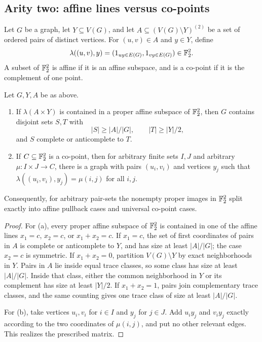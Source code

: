 \subsection{Arity two: affine lines versus co-points}

Let $G$ be a graph, let $Y\subseteq V(G)$, and let $A\subseteq (V(G)\setminus Y)^{(2)}$ be a set of ordered pairs of distinct vertices. For $(u,v)\in A$ and $y\in Y$, define
\[
  \lambda((u,v),y)=(1_{uy\in E(G)},1_{vy\in E(G)})\in \mathbb F_2^2.
\]
A subset of $\mathbb F_2^2$ is affine if it is an affine subspace, and is a co-point if it is the complement of one point.

\begin{proposition}\label{prop:arity-two}
Let $G,Y,A$ be as above.
\begin{enumerate}[label=(\alph*)]
\item If $\lambda(A\times Y)$ is contained in a proper affine subspace of $\mathbb F_2^2$, then $G$ contains disjoint sets $S,T$ with
\[
  |S|\ge |A|/|G|, \qquad |T|\ge |Y|/2,
\]
and $S$ complete or anticomplete to $T$.
\item If $C\subseteq \mathbb F_2^2$ is a co-point, then for arbitrary finite sets $I,J$ and arbitrary $\mu:I\times J\to C$, there is a graph with pairs $(u_i,v_i)$ and vertices $y_j$ such that $\lambda((u_i,v_i),y_j)=\mu(i,j)$ for all $i,j$.
\end{enumerate}
Consequently, for arbitrary pair-sets the nonempty proper images in $\mathbb F_2^2$ split exactly into affine pullback cases and universal co-point cases.
\end{proposition}

\begin{proof}
For (a), every proper affine subspace of $\mathbb F_2^2$ is contained in one of the affine lines $x_1=c$, $x_2=c$, or $x_1+x_2=c$. If $x_1=c$, the set of first coordinates of pairs in $A$ is complete or anticomplete to $Y$, and has size at least $|A|/|G|$; the case $x_2=c$ is symmetric. If $x_1+x_2=0$, partition $V(G)\setminus Y$ by exact neighborhoods in $Y$. Pairs in $A$ lie inside equal trace classes, so some class has size at least $|A|/|G|$. Inside that class, either the common neighborhood in $Y$ or its complement has size at least $|Y|/2$. If $x_1+x_2=1$, pairs join complementary trace classes, and the same counting gives one trace class of size at least $|A|/|G|$.

For (b), take vertices $u_i,v_i$ for $i\in I$ and $y_j$ for $j\in J$. Add $u_i y_j$ and $v_i y_j$ exactly according to the two coordinates of $\mu(i,j)$, and put no other relevant edges. This realizes the prescribed matrix.
\end{proof}

